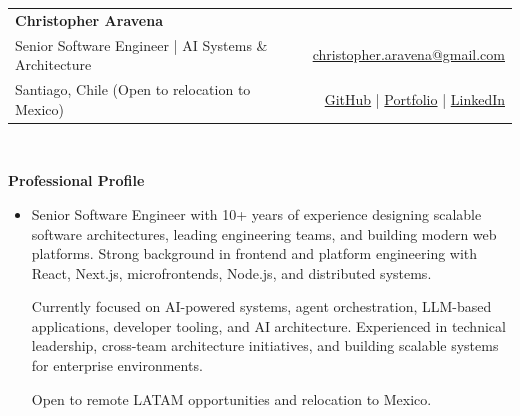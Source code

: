 \documentclass[letterpaper,11pt]{article}
\newcommand{\resheading}[1]{{\large \colorbox{mygrey}{\begin{minipage}{\textwidth}{\textbf{#1 \vphantom{p\^{E}}}}\end{minipage}}}}
\begin{document}
    
    \newcommand{\mywebheader}{
    \begin{tabular*}{7in}{l@{\extracolsep{\fill}}r}
        \textbf{{\LARGE Christopher Aravena}}\\
        {\footnotesize Senior Software Engineer | AI Systems \& Architecture} & \href{mailto:christopher.aravena@gmail.com}{christopher.aravena@gmail.com}\\
        {\footnotesize Santiago, Chile (Open to relocation to Mexico)} & \href{https://github.com/caravenas}{GitHub} \hspace{0.5em}|\hspace{0.5em} \href{https://chrisaravena.dev/}{Portfolio} \hspace{0.5em}|\hspace{0.5em} \href{https://www.linkedin.com/in/christopher-aravena-a0763135/}{LinkedIn}\\
        \end{tabular*}
    \\
    \vspace{0.1in}}
    
    \mywebheader
    
    \resheading{Professional Profile}
        \begin{itemize}
            \item[]
                { \footnotesize
                Senior Software Engineer with 10+ years of experience designing scalable software architectures, leading engineering teams, and building modern web platforms.
                Strong background in frontend and platform engineering with React, Next.js, microfrontends, Node.js, and distributed systems.

                Currently focused on AI-powered systems, agent orchestration, LLM-based applications, developer tooling, and AI architecture.
                Experienced in technical leadership, cross-team architecture initiatives, and building scalable systems for enterprise environments.

                Open to remote LATAM opportunities and relocation to Mexico.
                }
        \end{itemize}
\end{document}

